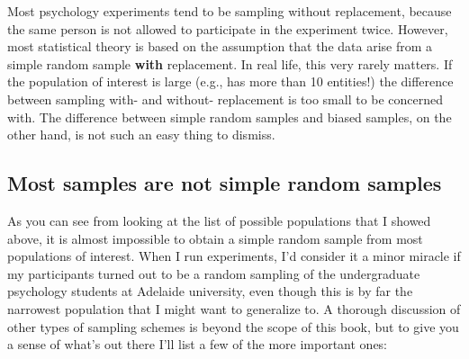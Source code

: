 \documentclass[
  letterpaper,
  DIV=11,
  numbers=noendperiod]{scrreprt}
\begin{document}
Most psychology experiments tend to be sampling without replacement,
because the same person is not allowed to participate in the experiment
twice. However, most statistical theory is based on the assumption that
the data arise from a simple random sample \textbf{with} replacement. In
real life, this very rarely matters. If the population of interest is
large (e.g., has more than 10 entities!) the difference between sampling
with- and without- replacement is too small to be concerned with. The
difference between simple random samples and biased samples, on the
other hand, is not such an easy thing to dismiss.

\subsection{Most samples are not simple random
samples}\label{most-samples-are-not-simple-random-samples}

As you can see from looking at the list of possible populations that I
showed above, it is almost impossible to obtain a simple random sample
from most populations of interest. When I run experiments, I'd consider
it a minor miracle if my participants turned out to be a random sampling
of the undergraduate psychology students at Adelaide university, even
though this is by far the narrowest population that I might want to
generalize to. A thorough discussion of other types of sampling schemes
is beyond the scope of this book, but to give you a sense of what's out
there I'll list a few of the more important ones:
\end{document}
